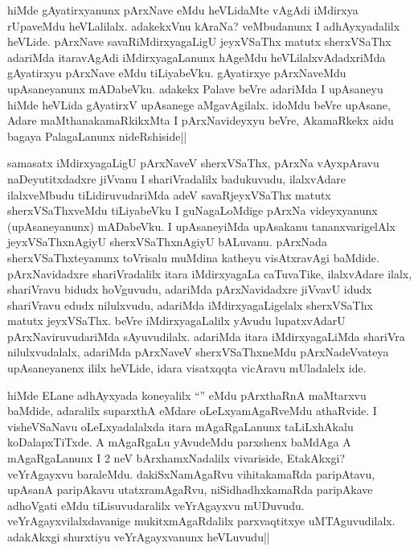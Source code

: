 \begin{artha}
hiMde gAyatirxyanunx pArxNave eMdu heVLidaMte vAgAdi iMdirxya rUpaveMdu heVLalilalx. adakekxVnu kAraNa? veMbudanunx I adhAyxyadalilx heVLide. pArxNave savaRiMdirxyagaLigU jeyxVSaThx matutx sherxVSaThx adariMda itaravAgAdi iMdirxyagaLanunx hAgeMdu heVLilalxvAdadxriMda gAyatirxyu pArxNave eMdu tiLiyabeVku. gAyatirxye pArxNaveMdu upAsaneyanunx mADabeVku. adakekx Palave beVre adariMda I upAsaneyu hiMde heVLida gAyatirxV upAsanege aMgavAgilalx. idoMdu beVre upAsane, Adare maMthanakamaRkikxMta I pArxNavideyxyu beVre, AkamaRkekx aidu bagaya PalagaLanunx nideRshiside||
\end{artha}

\begin{artha}
samasatx iMdirxyagaLigU pArxNaveV sherxVSaThx, pArxNa vAyxpAravu naDeyutitxdadxre jiVvanu I shariVradalilx badukuvudu, ilalxvAdare ilalxveMbudu tiLidiruvudariMda adeV savaRjeyxVSaThx matutx sherxVSaThxveMdu tiLiyabeVku I guNagaLoMdige pArxNa videyxyanunx (upAsaneyanunx) mADabeVku. I upAsaneyiMda upAsakanu tananxvarigelAlx jeyxVSaThxnAgiyU sherxVSaThxnAgiyU bALuvanu. pArxNada sherxVSaThxteyanunx toVrisalu muMdina katheyu visAtxravAgi baMdide. pArxNavidadxre shariVradalilx itara iMdirxyagaLa caTuvaTike, ilalxvAdare ilalx, shariVravu bidudx hoVguvudu, adariMda pArxNavidadxre jiVvavU idudx shariVravu edudx nilulxvudu, adariMda iMdirxyagaLigelalx sherxVSaThx matutx jeyxVSaThx. beVre iMdirxyagaLalilx yAvudu lupatxvAdarU pArxNaviruvudariMda sAyuvudilalx. adariMda itara iMdirxyagaLiMda shariVra nilulxvudalalx, adariMda pArxNaveV sherxVSaThxneMdu pArxNadeVvateya upAsaneyanenx ililx heVLide, idara visatxqqta vicAravu mUladalelx ide.
\end{artha}

\begin{artha}
hiMde ELane adhAyxyada koneyalilx ``\stext'' eMdu pArxthaRnA maMtarxvu baMdide, adaralilx suparxthA eMdare oLeLxyamAgaRveMdu athaRvide. I visheVSaNavu oLeLxyadalalxda itara mAgaRgaLanunx taLiLxhAkalu koDalapxTiTxde. A mAgaRgaLu yAvudeMdu parxshenx baMdAga A mAgaRgaLanunx I 2 neV bArxhamxNadalilx vivariside, EtakAkxgi? veYrAgayxvu baraleMdu. dakiSxNamAgaRvu vihitakamaRda paripAtavu, upAsanA paripAkavu utatxramAgaRvu, niSidhadhxkamaRda paripAkave adhoVgati eMdu tiLisuvudaralilx veYrAgayxvu mUDuvudu. veYrAgayxvilalxdavanige mukitxmAgaRdalilx parxvaqtitxye uMTAguvudilalx. adakAkxgi shurxtiyu veYrAgayxvanunx heVLuvudu||
\end{artha}

